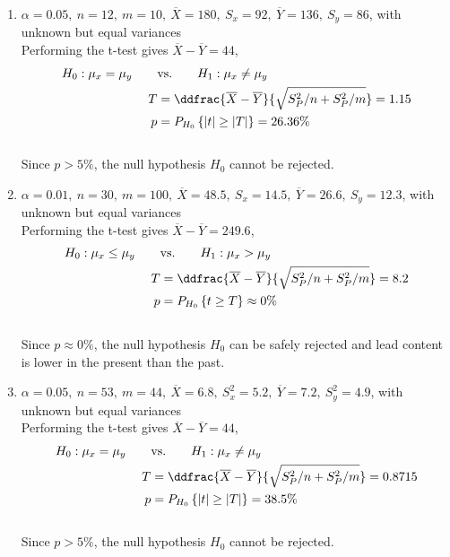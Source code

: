 \begin{enumerate}
	
	\item $\alpha = 0.05,\ n = 12,\ m = 10,\ \overline{X} = 180,\ S_x = 92,\ \overline{Y} = 136,\ S_y = 86$, with unknown but equal variances\\
	Performing the t-test gives $ \overline{X} - \overline{Y} = 44 $,\\
	
	\begin{align}
		H_0 : \mu_x = \mu_y \qquad &\text{vs.} \qquad H_1 : \mu_x \neq \mu_y \nonumber \\
		T &= \ddfrac{ \overline{X} - \overline{Y} }{\sqrt{S_P^2/n + S_P^2/m}} = 1.15 \nonumber \\
		p &= P_{H_0}\left\{|t| \geq |T|\right\} = 26.36\% 
	\end{align}\\
	Since $ p > 5\% $, the null hypothesis $ H_0 $ cannot be rejected.\\
	
	\item $\alpha = 0.01,\ n = 30,\ m = 100,\ \overline{X} = 48.5,\ S_x = 14.5,\ \overline{Y} = 26.6,\ S_y = 12.3$, with unknown but equal variances\\
	Performing the t-test gives $ \overline{X} - \overline{Y} = 249.6 $,\\
	
	\begin{align}
		H_0 : \mu_x \leq \mu_y \qquad &\text{vs.} \qquad H_1 : \mu_x > \mu_y \nonumber \\
		T &= \ddfrac{ \overline{X} - \overline{Y} }{\sqrt{S_P^2/n + S_P^2/m}} = 8.2 \nonumber \\
		p &= P_{H_0}\left\{t \geq T\right\} \approx 0\% 
	\end{align}\\
	Since $ p \approx 0\% $, the null hypothesis $ H_0 $ can be safely rejected and lead content is lower in the present than the past.\\
	
	\item $\alpha = 0.05,\ n = 53,\ m = 44,\ \overline{X} = 6.8,\ S_x^2 = 5.2,\ \overline{Y} = 7.2,\ S_y^2 = 4.9$, with unknown but equal variances\\
	Performing the t-test gives $ \overline{X} - \overline{Y} = 44 $,\\
	
	\begin{align}
		H_0 : \mu_x = \mu_y \qquad &\text{vs.} \qquad H_1 : \mu_x \neq \mu_y \nonumber \\
		T &= \ddfrac{ \overline{X} - \overline{Y} }{\sqrt{S_P^2/n + S_P^2/m}} = 0.8715 \nonumber \\
		p &= P_{H_0}\left\{|t| \geq |T|\right\} = 38.5\% 
	\end{align}\\
	Since $ p > 5\% $, the null hypothesis $ H_0 $ cannot be rejected.\\
	

\end{enumerate}
